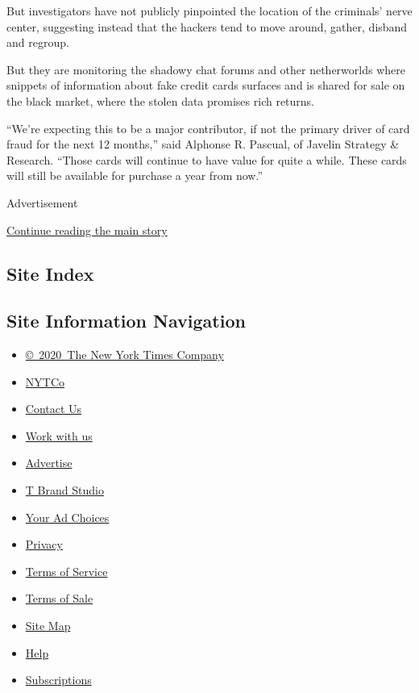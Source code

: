 But investigators have not publicly pinpointed the location of the
criminals' nerve center, suggesting instead that the hackers tend to
move around, gather, disband and regroup.

But they are monitoring the shadowy chat forums and other netherworlds
where snippets of information about fake credit cards surfaces and is
shared for sale on the black market, where the stolen data promises rich
returns.

``We're expecting this to be a major contributor, if not the primary
driver of card fraud for the next 12 months,'' said Alphonse R. Pascual,
of Javelin Strategy \& Research. ``Those cards will continue to have
value for quite a while. These cards will still be available for
purchase a year from now.''

Advertisement

\protect\hyperlink{after-bottom}{Continue reading the main story}

\hypertarget{site-index}{%
\subsection{Site Index}\label{site-index}}

\hypertarget{site-information-navigation}{%
\subsection{Site Information
Navigation}\label{site-information-navigation}}

\begin{itemize}
\tightlist
\item
  \href{https://help.nytimes.com/hc/en-us/articles/115014792127-Copyright-notice}{©~2020~The
  New York Times Company}
\end{itemize}

\begin{itemize}
\tightlist
\item
  \href{https://www.nytco.com/}{NYTCo}
\item
  \href{https://help.nytimes.com/hc/en-us/articles/115015385887-Contact-Us}{Contact
  Us}
\item
  \href{https://www.nytco.com/careers/}{Work with us}
\item
  \href{https://nytmediakit.com/}{Advertise}
\item
  \href{http://www.tbrandstudio.com/}{T Brand Studio}
\item
  \href{https://www.nytimes.com/privacy/cookie-policy\#how-do-i-manage-trackers}{Your
  Ad Choices}
\item
  \href{https://www.nytimes.com/privacy}{Privacy}
\item
  \href{https://help.nytimes.com/hc/en-us/articles/115014893428-Terms-of-service}{Terms
  of Service}
\item
  \href{https://help.nytimes.com/hc/en-us/articles/115014893968-Terms-of-sale}{Terms
  of Sale}
\item
  \href{https://spiderbites.nytimes.com}{Site Map}
\item
  \href{https://help.nytimes.com/hc/en-us}{Help}
\item
  \href{https://www.nytimes.com/subscription?campaignId=37WXW}{Subscriptions}
\end{itemize}
